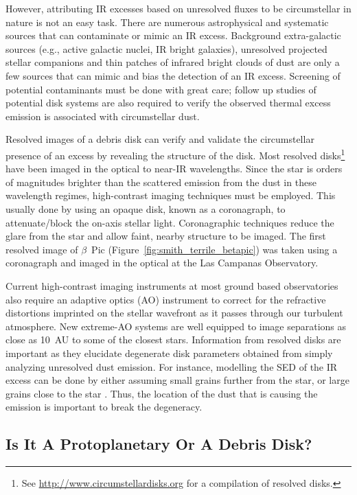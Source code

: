         
        However, attributing IR excesses based on unresolved fluxes to be circumstellar in nature is not an easy task. There are numerous astrophysical and systematic sources that can contaminate or mimic an IR excess. Background extra-galactic sources (e.g., active galactic nuclei, IR bright galaxies), unresolved projected stellar companions and thin patches of infrared bright clouds of dust are only a few sources that can mimic and bias the detection of an IR excess. Screening of potential contaminants must be done with great care; follow up studies of potential disk systems are also required to verify the observed thermal excess emission is associated with circumstellar dust.
        
    Resolved images of a debris disk can verify and validate the circumstellar presence of an excess by revealing the structure of the disk. Most resolved disks\footnote{See \url{http://www.circumstellardisks.org} for a compilation of resolved disks.} have been imaged in the optical to near-IR wavelengths. Since the star is orders of magnitudes brighter than the scattered emission from the dust in these wavelength regimes, high-contrast imaging techniques must be employed. This usually done by using an opaque disk, known as a coronagraph, to attenuate/block the on-axis stellar light. Coronagraphic techniques reduce the glare from the star and allow faint, nearby structure to be imaged. The first resolved image of $\beta$~Pic (Figure~\ref{fig:smith_terrile_betapic}) was taken using a coronagraph and imaged in the optical at the Las Campanas Observatory.
        
    Current high-contrast imaging instruments at most ground based observatories also require an adaptive optics (AO) instrument to correct for the refractive distortions imprinted on the stellar wavefront as it passes through our turbulent atmosphere. New extreme-AO systems \citep[e.g., Gemini Planet Imager,][]{Macintosh2006} are well equipped to image separations as close as 10~AU to some of the closest stars. Information from resolved disks are important as they elucidate degenerate disk parameters obtained from simply analyzing unresolved dust emission. For instance, modelling the SED of the IR excess can be done by either assuming small grains further from the star, or large grains close to the star \citep{Krivov2010}. Thus, the location of the dust that is causing the emission is important to break the degeneracy\citep[e.g., Figure 13][]{Su2006}. 
        
        
    \subsection{Is It A Protoplanetary Or A Debris Disk?}
    
